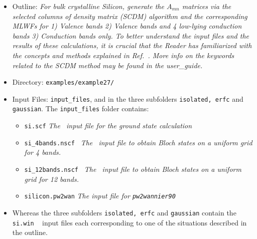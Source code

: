\documentclass[a4paper,11pt,twoside]{article}
\begin{document}
\begin{itemize}
\item{Outline: \it{For bulk crystalline Silicon, generate the $A_{mn}$ matrices via the selected columns of density matrix (SCDM) algorithm  and the corresponding MLWFs for 1) Valence bands 2) Valence bands and 4 low-lying conduction bands 3) Conduction bands only. To better understand the input files and the results of these calculations, it is crucial that the Reader has familiarized with the concepts and methods explained in Ref.~\cite{LinLin-ArXiv2017}. More info on the keywords related to the SCDM method may be found in the user\_guide.}}
\item{Directory: {\tt examples/example27/}}
\item{Input Files: {\tt input\_files}, and in the three subfolders {\tt isolated, erfc} and {\tt gaussian}. 
The {\tt input\_files} folder contains:}
\begin{itemize}
\item{ {\tt si.scf}  {\it The \pwscf\ input file for the ground state
    calculation}} 
\item{ {\tt si\_4bands.nscf }  {\it The \pwscf\ input file to obtain Bloch
    states on a uniform grid for 4 bands.}}
\item{ {\tt si\_12bands.nscf }  {\it The \pwscf\ input file to obtain Bloch
    states on a uniform grid for 12 bands.}}
\item{ {\tt silicon.pw2wan}  {\it The input file for {\tt pw2wannier90}}}
\end{itemize}
\item{ Whereas the three subfolders {\tt isolated, erfc} and {\tt gaussian} contain the {\tt si.win} \wannier~ input files each corresponding to one of the situations described in the outline.}
\end{itemize}
\end{document}
